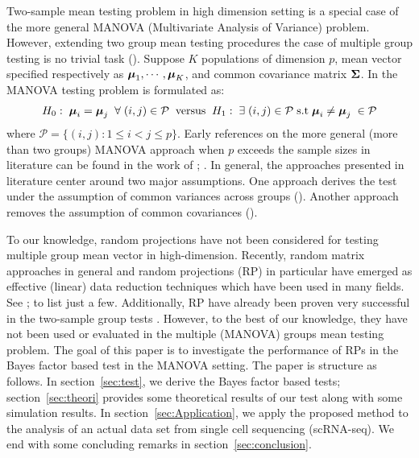 \documentclass[12pt]{article}
\theoremstyle{plain}%
\theoremstyle{definition}
\def\be{\begin{eqnarray}}
\def\ee{\end{eqnarray}}
\newcommand{\umu}               {\mbox{\boldmath$\mu$}}
\newcommand{\uSigma}            {\mbox{\boldmath$\Sigma$}}
\begin{document}
Two-sample mean testing problem in high dimension setting is a special case of the more general MANOVA (Multivariate Analysis of Variance) problem. However, extending two group mean testing procedures the case of multiple group testing is no trivial task (\citealp[]{cai2014high}). Suppose $K$ populations of dimension $p$, mean vector specified respectively as $\umu_1, \cdots, \umu_{K}$, and common covariance matrix $\uSigma$. In the MANOVA testing problem is formulated as:
\be
H_{0}:\; \umu_i = \umu_j\; \; \forall \; (i,j) \in \mathcal{P}\;  \; \mbox{versus} \; \; H_{1}:\; \exists \; (i,j) \in \mathcal{P}\; \mbox{s.t}   \; \umu_i \neq \umu_j\; \in \mathcal{P}  \label{eq:test1}
\ee
where $\mathcal{P} = \{(i,j): 1 \leq i < j \leq p  \}$.
Early references on the more general (more than two groups) MANOVA approach when $p$ exceeds the sample sizes in literature can be found in the work of \cite{dempster1958high}; \cite{dempster1960significance}. In general, the approaches presented in literature center around two major assumptions. One approach derives the test under the assumption of common variances across groups (\cite{fujikoshi2004asymptotic}). Another approach removes the assumption of common covariances (\citealp{srivastava2007multivariate}).

 To our knowledge, random projections have not been considered for testing multiple group mean vector in high-dimension. Recently, random matrix approaches in general and random projections (RP) in particular have emerged as effective (linear) data reduction techniques which have been used in many fields. See \citealp{wan2020sharp}; \citealp{lopez2021tuning} to list just a few. Additionally, RP have already been proven very successful in the two-sample group tests \cite{lopes2011more, srivastava2014raptt,zoh2018powerful}. However, to the best of our knowledge, they have not been used or evaluated in the multiple (MANOVA) groups mean testing problem. The goal of this paper is to investigate the performance of RPs in the Bayes factor based test in the MANOVA setting. The paper is structure as follows. In section~\ref{sec:test}, we derive the Bayes factor based tests; section~\ref{sec:theori} provides some theoretical results of our test along with some simulation results. In section~\ref{sec:Application}, we apply the proposed method to the analysis of an actual data set from single cell sequencing (scRNA-seq). We end with some concluding remarks in section~\ref{sec:conclusion}. 
 
\end{document}
